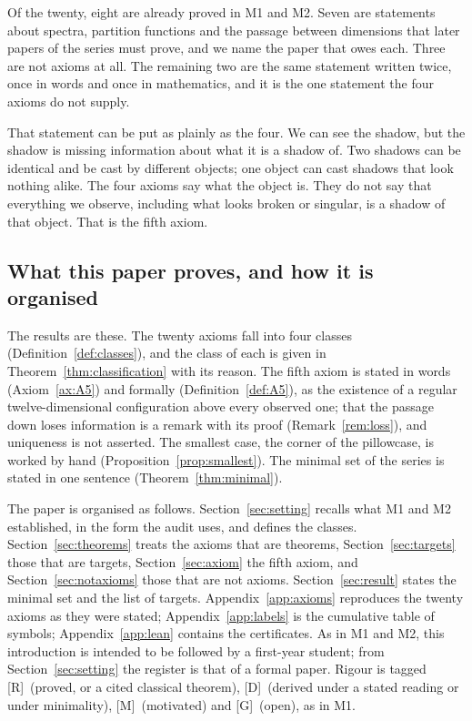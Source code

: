\documentclass[11pt,a4paper]{article}
\theoremstyle{plain}
\theoremstyle{definition}
\theoremstyle{remark}
\newcommand{\rigR}{[\textup{R}]}
\newcommand{\rigD}{[\textup{D}]}
\newcommand{\rigM}{[\textup{M}]}
\newcommand{\rigG}{[\textup{G}]}
\begin{document}
Of the twenty, eight are already proved in M1 and M2. Seven are statements about spectra, partition functions and the passage between dimensions that later papers of the series must prove, and we name the paper that owes each. Three are not axioms at all. The remaining two are the same statement written twice, once in words and once in mathematics, and it is the one statement the four axioms do not supply.

That statement can be put as plainly as the four. We can see the shadow, but the shadow is missing information about what it is a shadow of. Two shadows can be identical and be cast by different objects; one object can cast shadows that look nothing alike. The four axioms say what the object is. They do not say that everything we observe, including what looks broken or singular, is a shadow of that object. That is the fifth axiom.

\subsection{What this paper proves, and how it is organised}\label{sec:results}

The results are these. The twenty axioms fall into four classes (Definition~\ref{def:classes}), and the class of each is given in Theorem~\ref{thm:classification} with its reason. The fifth axiom is stated in words (Axiom~\ref{ax:A5}) and formally (Definition~\ref{def:A5}), as the existence of a regular twelve-dimensional configuration above every observed one; that the passage down loses information is a remark with its proof (Remark~\ref{rem:loss}), and uniqueness is not asserted. The smallest case, the corner of the pillowcase, is worked by hand (Proposition~\ref{prop:smallest}). The minimal set of the series is stated in one sentence (Theorem~\ref{thm:minimal}).

The paper is organised as follows. Section~\ref{sec:setting} recalls what M1 and M2 established, in the form the audit uses, and defines the classes. Section~\ref{sec:theorems} treats the axioms that are theorems, Section~\ref{sec:targets} those that are targets, Section~\ref{sec:axiom} the fifth axiom, and Section~\ref{sec:notaxioms} those that are not axioms. Section~\ref{sec:result} states the minimal set and the list of targets. Appendix~\ref{app:axioms} reproduces the twenty axioms as they were stated; Appendix~\ref{app:labels} is the cumulative table of symbols; Appendix~\ref{app:lean} contains the certificates. As in M1 and M2, this introduction is intended to be followed by a first-year student; from Section~\ref{sec:setting} the register is that of a formal paper. Rigour is tagged \rigR\ (proved, or a cited classical theorem), \rigD\ (derived under a stated reading or under minimality), \rigM\ (motivated) and \rigG\ (open), as in M1.
\end{document}
